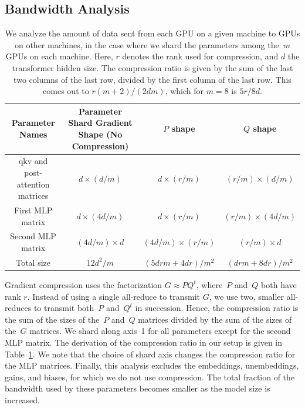\documentclass{article}
\begin{document}
\subsection{Bandwidth Analysis}
\label{sec:dist_train_bw}
%
\begin{table}[]
    \centering\small
    \begin{tabular}{cccc}
        \toprule
         Parameter Names & Parameter Shard Gradient Shape (No Compression) & $P$ shape & $Q$ shape \\
         \midrule
         qkv and post-attention matrices & $d \times (d / m)$ & $d \times (r / m)$ & $(r / m) \times (d / m)$ \\
         First MLP matrix & $d \times (4d / m)$ & $d \times (r / m)$ & $(r / m) \times (4d / m)$ \\
         Second MLP matrix & $(4d / m) \times d$ & $(4d / m) \times (r / m)$ & $(r / m) \times d$ \\
         Total size & $12d^2 / m$ & $(5drm + 4dr) / m^2$ & $(drm + 8dr) / m^2$ \\
         \bottomrule
    \end{tabular}
    \caption{We analyze the amount of data sent from each GPU on a given machine to GPUs on other machines, in the case where we shard the parameters among the~$m$ GPUs on each machine. Here, $r$ denotes the rank used for compression, and $d$ the transformer hidden size. The compression ratio is given by the sum of the last two columns of the last row, divided by the first column of the last row. This comes out to $r(m + 2) / (2dm)$, which for $m = 8$ is $5r / 8d$.}
    \label{tab:cmp_ratio}
\end{table}
%
Gradient compression uses the factorization $G \approx P Q^t$, where~$P$ and~$Q$ both have rank $r$. Instead of using a single all-reduce to transmit $G$, we use two, smaller all-reduces to transmit both~$P$ and~$Q^t$ in succession. Hence, the compression ratio is the sum of the sizes of the~$P$ and~$Q$ matrices divided by the sum of the sizes of the~$G$ matrices. We shard along axis~1 for all parameters except for the second MLP matrix. The derivation of the compression ratio in our setup is given in Table~\ref{tab:cmp_ratio}. We note that the choice of shard axis changes the compression ratio for the MLP matrices. Finally, this analysis excludes the embeddings, unembeddings, gains, and biases, for which we do not use compression. The total fraction of the bandwidth used by these parameters becomes smaller as the model size is increased.
\end{document}
